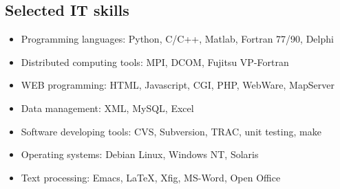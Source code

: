 \documentclass[12pt,a4paper]{article}
\begin{document}
\subsection*{Selected IT skills}
\begin{itemize} 
  \item Programming languages: Python, C/C++, Matlab, Fortran 77/90, Delphi
  \item Distributed computing tools: MPI, DCOM, Fujitsu VP-Fortran
  \item WEB programming: HTML, Javascript, CGI, PHP, WebWare, MapServer 
  \item Data management: XML, MySQL, Excel 
  \item Software developing tools: CVS, Subversion, TRAC, unit testing, make
  \item Operating systems: Debian Linux, Windows NT, Solaris
  \item Text processing: Emacs, \LaTeX, Xfig, MS-Word, Open Office
\end{itemize}
\end{document}
